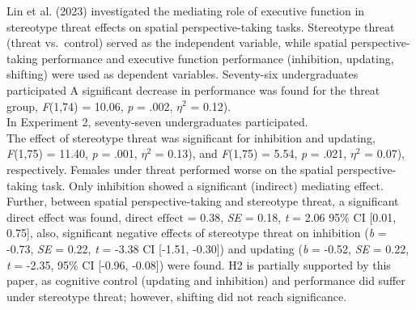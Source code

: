 \documentclass[
  stu, a4paper,floatsintext]{apa7}
\begin{document}
Lin et al. (2023) investigated the mediating role of executive function in stereotype threat effects on spatial perspective-taking tasks.
Stereotype threat (threat vs.~control) served as the independent variable, while spatial perspective-taking performance and executive function performance (inhibition, updating, shifting) were used as dependent variables.
Seventy-six undergraduates participated
A significant decrease in performance was found for the threat group, \emph{F}(1,74) = 10.06, \emph{p} = .002, \(\eta^{2}\) = 0.12).\\
In Experiment 2, seventy-seven undergraduates participated.\\
The effect of stereotype threat was significant for inhibition and updating, \emph{F}(1,75) = 11.40, \emph{p} = .001, \(\eta^{2}\) = 0.13), and \emph{F}(1,75) = 5.54, \emph{p} = .021, \(\eta^{2}\) = 0.07), respectively.
Females under threat performed worse on the spatial perspective-taking task.
Only inhibition showed a significant (indirect) mediating effect.
Further, between spatial perspective-taking and stereotype threat, a significant direct effect was found, \(\text{direct effect}\) = 0.38, \emph{SE} = 0.18, \emph{t} = 2.06 95\% \(\text{CI}\) {[}0.01, 0.75{]}, also, significant negative effects of stereotype threat on inhibition (\emph{b} = -0.73, \emph{SE} = 0.22, \emph{t} = -3.38 CI {[}-1.51, -0.30{]}) and updating (\emph{b} = -0.52, \emph{SE} = 0.22, \emph{t} = -2.35, 95\% CI {[}-0.96, -0.08{]}) were found.
H2 is partially supported by this paper, as cognitive control (updating and inhibition) and performance did suffer under stereotype threat; however, shifting did not reach significance.
\end{document}
